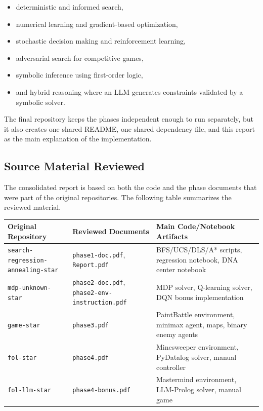 \documentclass[11pt,a4paper]{article}
\newcommand{\code}[1]{\texttt{#1}}
\begin{document}
\begin{itemize}[leftmargin=*]
    \item deterministic and informed search,
    \item numerical learning and gradient-based optimization,
    \item stochastic decision making and reinforcement learning,
    \item adversarial search for competitive games,
    \item symbolic inference using first-order logic,
    \item and hybrid reasoning where an LLM generates constraints validated by a symbolic solver.
\end{itemize}

The final repository keeps the phases independent enough to run separately, but it also creates one shared README, one shared dependency file, and this report as the main explanation of the implementation.

\subsection{Source Material Reviewed}

The consolidated report is based on both the code and the phase documents that were part of the original repositories. The following table summarizes the reviewed material.

\begin{longtable}{p{}p{}p{}}
\toprule
\textbf{Original Repository} & \textbf{Reviewed Documents} & \textbf{Main Code/Notebook Artifacts} \\
\midrule
\endhead
\code{search-regression-annealing-star} & \code{phase1-doc.pdf}, \code{Report.pdf} & BFS/UCS/DLS/A* scripts, regression notebook, DNA center notebook \\
\code{mdp-unknown-star} & \code{phase2-doc.pdf}, \code{phase2-env-instruction.pdf} & MDP solver, Q-learning solver, DQN bonus implementation \\
\code{game-star} & \code{phase3.pdf} & PaintBattle environment, minimax agent, maps, binary enemy agents \\
\code{fol-star} & \code{phase4.pdf} & Minesweeper environment, PyDatalog solver, manual controller \\
\code{fol-llm-star} & \code{phase4-bonus.pdf} & Mastermind environment, LLM-Prolog solver, manual game \\
\bottomrule
\end{longtable}
\end{document}
